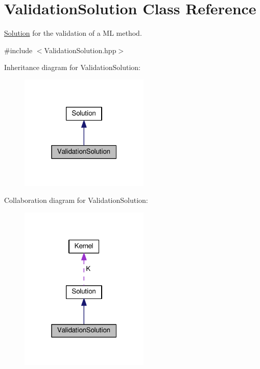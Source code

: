 \hypertarget{class_validation_solution}{}\section{Validation\+Solution Class Reference}
\label{class_validation_solution}


\hyperlink{class_solution}{Solution} for the validation of a ML method.  




{\ttfamily \#include $<$Validation\+Solution.\+hpp$>$}



Inheritance diagram for Validation\+Solution\+:\nopagebreak
\begin{figure}[H]
\begin{center}
\leavevmode
\includegraphics[width=175pt]{class_validation_solution__inherit__graph}
\end{center}
\end{figure}


Collaboration diagram for Validation\+Solution\+:\nopagebreak
\begin{figure}[H]
\begin{center}
\leavevmode
\includegraphics[width=175pt]{class_validation_solution__coll__graph}
\end{center}
\end{figure}
